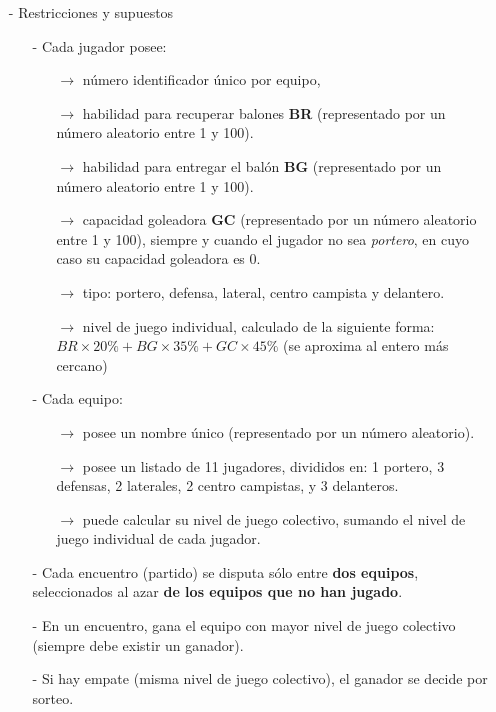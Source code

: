 \documentclass[10pt]{article}
\begin{document}
\begin{enumerate}
{\begin{itemize}
    \item[-] Restricciones y supuestos
    \begin{itemize}
        \item[-] Cada jugador posee:
        \begin{itemize}
             \item[$\rightarrow$] n\'umero identificador \'unico por equipo, 
             \item[$\rightarrow$] habilidad para recuperar balones \textbf{BR} (representado por un n\'umero aleatorio entre 1 y 100).
             \item[$\rightarrow$] habilidad para entregar el bal\'on \textbf{BG} (representado por un n\'umero aleatorio entre 1 y 100).
             \item[$\rightarrow$] capacidad goleadora \textbf{GC} (representado por un n\'umero aleatorio entre 1 y 100), siempre y cuando el jugador no sea \emph{portero}, en cuyo caso su capacidad goleadora es 0.
             \item[$\rightarrow$] tipo: portero, defensa, lateral, centro campista y delantero.
             \item[$\rightarrow$] nivel de juego individual, calculado de la siguiente forma: $BR \times 20\% + BG \times 35\% + GC \times 45\%$ (se aproxima al entero m\'as cercano)
        \end{itemize} 
        \item[-] Cada equipo:
        \begin{itemize}
            \item[$\rightarrow$] posee un nombre \'unico (representado por un n\'umero aleatorio).
            \item[$\rightarrow$] posee un listado de 11 jugadores, divididos en: 1 portero, 3 defensas, 2 laterales, 2 centro campistas, y 3 delanteros.
            \item[$\rightarrow$] puede calcular su nivel de juego colectivo, sumando el nivel de juego individual de cada jugador. 
        \end{itemize} 
        \item[-] Cada encuentro (partido) se disputa s\'olo entre \textbf{dos equipos}, seleccionados al azar \textbf{de los equipos que no han jugado}.
        \item[-] En un encuentro, gana el equipo con mayor nivel de juego colectivo (siempre debe existir un ganador).
        \item[-] Si hay empate (misma nivel de juego colectivo), el ganador se decide por sorteo.

\end{itemize}
\end{itemize}}
\end{enumerate}
\end{document}
